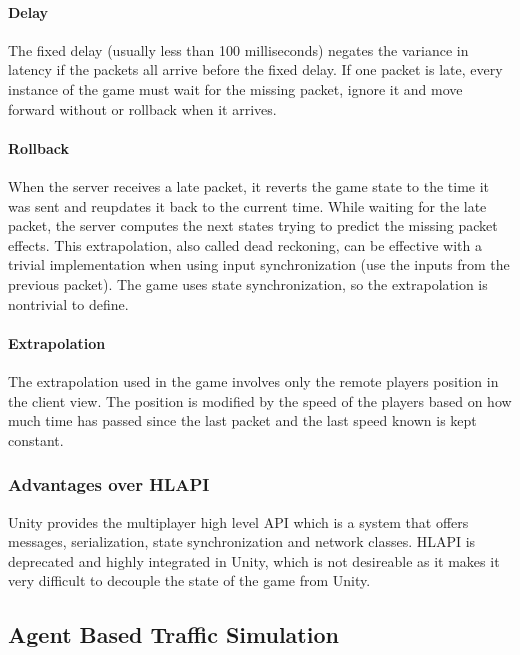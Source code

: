 \documentclass[12pt]{article}
\begin{document}
\paragraph{Delay}
The fixed delay (usually less than 100 milliseconds) negates the variance in latency if the packets all arrive before the fixed delay. If one packet is late, every instance of the game must wait for the missing packet, ignore it and move forward without or rollback when it arrives.

\paragraph{Rollback}
When the server receives a late packet, it reverts the game state to the time it was sent and reupdates it back to the current time. While waiting for the late packet, the server computes the next states trying to predict the missing packet effects. This extrapolation, also called dead reckoning, can be effective with a trivial implementation when using input synchronization (use the inputs from the previous packet). The game uses state synchronization, so the extrapolation is nontrivial to define.

\paragraph{Extrapolation}
The extrapolation used in the game involves only the remote players position in the client view. The position is modified by the speed of the players based on how much time has passed since the last packet and the last speed known is kept constant.

\subsubsection{Advantages over HLAPI \cite{hlapi}}
Unity provides the multiplayer high level API which is a system that offers messages, serialization, state synchronization and network classes. HLAPI is deprecated and highly integrated in Unity, which is not desireable as it makes it very difficult to decouple the state of the game from Unity.

\clearpage

\subsection{Agent Based Traffic Simulation}
\end{document}
